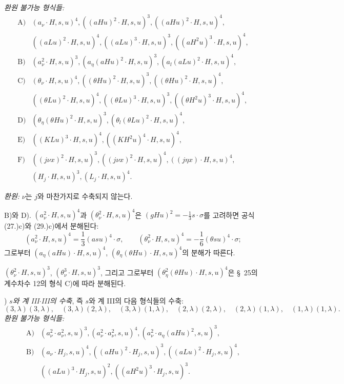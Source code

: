 \noindent\emph{환원 불가능 형식들:}
\[
\begin{array}{rl}
\text{A)}&(a_\nu\cdot H,s,u)^4,
((aHu)^2\cdot H,s,u)^3,
((aHu)^2\cdot H,s,u)^4,\\[0.25em]
&((aLu)^2\cdot H,s,u)^4,
((aLu)^3\cdot H,s,u)^3,
((aH^2u)^3\cdot H,s,u)^4,\\[0.45em]
\text{B)}&(a_\nu^2\cdot H,s,u)^3,
(a_\eta(aHu)^2\cdot H,s,u)^3,
(a_l(aLu)^2\cdot H,s,u)^4,\\[0.45em]
\text{C)}&(\theta_\nu\cdot H,s,u)^4,
((\theta Hu)^2\cdot H,s,u)^3,
((\theta Hu)^2\cdot H,s,u)^4,\\[0.25em]
&((\theta Lu)^2\cdot H,s,u)^4,
((\theta Lu)^3\cdot H,s,u)^3,
((\theta H^2u)^3\cdot H,s,u)^4,\\[0.45em]
\text{D)}&(\theta_\eta(\theta Hu)^2\cdot H,s,u)^3,
(\theta_l(\theta Lu)^2\cdot H,s,u)^4,\\[0.45em]
\text{E)}&((KLu)^3\cdot H,s,u)^4,
((KH^2u)^4\cdot H,s,u)^4,\\[0.45em]
\text{F)}&((j\nu x)^2\cdot H,s,u)^3,
((j\nu x)^2\cdot H,s,u)^4,
((j\eta x)\cdot H,s,u)^4,\\[0.25em]
&(H_j\cdot H,s,u)^3,
(L_j\cdot H,s,u)^4.
\end{array}
\]

\noindent\emph{환원:} $\nu$는 $j$와 마찬가지로 수축되지 않는다.

B)와 D). $(a_\nu^2\cdot H,s,u)^4$과 $(\theta_\nu^2\cdot H,s,u)^4$은 $(gHu)^2=-\frac13s\cdot\sigma$를 고려하면 공식 (27.)c)와 (29.)c)에서 분해된다:
\[
(a_\nu^2\cdot H,s,u)^4=\frac13(asu)^4\cdot\sigma,
\qquad
(\theta_\nu^2\cdot H,s,u)^4=-\frac16(\theta su)^4\cdot\sigma;
\]
그로부터 $(a_\eta(aHu)\cdot H,s,u)^4$, $(\theta_\eta(\theta Hu)\cdot H,s,u)^4$의 분해가 따른다.

$(\theta_\nu^2\cdot H,s,u)^3$, $(\theta_\nu^3\cdot H,s,u)^3$, 그리고 그로부터 $(\theta_\eta^2(\theta Hu)\cdot H,s,u)^4$은 \S\ 25의 계수차수 12의 형식 C)에 따라 분해된다.

) \emph{$s$와 계 III$\cdot$III의 수축}, 즉 $s$와 계 III의 다음 형식들의 수축:
\[
(3,\lambda)(3,\lambda),\quad (3,\lambda)(2,\lambda),\quad (3,\lambda)(1,\lambda),\quad
(2,\lambda)(2,\lambda),\quad (2,\lambda)(1,\lambda),\quad
(1,\lambda)(1,\lambda).
\]
\noindent\emph{환원 불가능 형식들:}
\[
\begin{array}{rl}
\text{A)}&(a_\nu^2\cdot a_\nu^2,s,u)^3,
(a_\nu^2\cdot a_\nu^2,s,u)^4,
(a_\nu^2\cdot a_\eta(aHu)^2,s,u)^3,\\[0.45em]
\text{B)}&(a_\nu\cdot H_j,s,u)^4,
((aHu)^2\cdot H_j,s,u)^3,
((aLu)^2\cdot H_j,s,u)^4,\\[0.25em]
&((aLu)^3\cdot H_j,s,u)^2,
((aH^2u)^3\cdot H_j,s,u)^3.
\end{array}
\]

